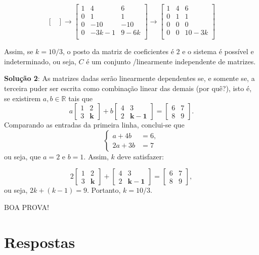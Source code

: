 \documentclass[12pt,a4paper]{article}
\newcommand*\R{\mathbb{R}}
\begin{document}
\begin{ExerciseList}
\[\begin{bmatrix}
\end{bmatrix}
\rightarrow
\begin{bmatrix}
1 & 4 & 6\\
0 & 1 & 1\\
0 & -10 & -10\\
0 & -3k-1 & 9-6k\\
\end{bmatrix}
\rightarrow
\begin{bmatrix}
1 & 4 & 6\\
0 & 1 & 1\\
0 & 0 & 0\\
0 & 0 & 10-3k\\
\end{bmatrix}
\]

Assim, se $k=10/3$, o posto da matriz de coeficientes é $2$ e o sistema é possível e indeterminado, ou seja, $C$ é um conjunto /linearmente independente de matrizes.

\textbf{Solução 2}: As matrizes dadas serão linearmente dependentes se, e somente se, a terceira puder ser escrita como combinação linear das demais (por quê?), isto é, se existirem $a,b \in \R$ tais que
\[
a
\begin{bmatrix}
1 & 2 \\ 3 & \mathbf{k}
\end{bmatrix}
+b
\begin{bmatrix}
4 & 3 \\ 2 & \mathbf{k-1}
\end{bmatrix}
=
\begin{bmatrix}
6 & 7 \\ 8 & 9
\end{bmatrix}.
\]
Comparando as entradas da primeira linha, conclui-se que
\[
\begin{cases}
a +4b &=6,\\
2a+3b &=7
\end{cases}
\]
ou seja, que $a = 2$ e $b = 1$. Assim, $k$ deve satisfazer:

\[
2
\begin{bmatrix}
1 & 2 \\ 3 & \mathbf{k}
\end{bmatrix}
+
\begin{bmatrix}
4 & 3 \\ 2 & \mathbf{k-1}
\end{bmatrix}
=
\begin{bmatrix}
6 & 7 \\ 8 & 9
\end{bmatrix},
\]
ou seja, $2k + (k-1) = 9$. Portanto, $k = 10/3$.
\end{ExerciseList}

\begin{center}
BOA PROVA!
\end{center}

\newpage
\restoregeometry
\section*{Respostas}
\shipoutAnswer
\end{document}

